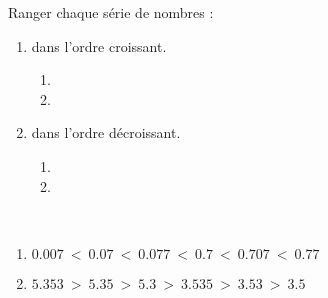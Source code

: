 \begin{exercice}
    Ranger chaque série de nombres :
    \begin{enumerate}
       \item dans l'ordre croissant. \smallskip
       \begin{enumerate}
          \item {} \;  \;  \;  \;  \;  \smallskip
          \item {} \;  \;  \;  \;  \; 
       \end{enumerate}
       \item dans l'ordre décroissant. \smallskip
       \begin{enumerate}
          \item {} \;  \;  \;  \;  \;  \smallskip
          \item {} \;  \;  \;  \;  \; 
       \end{enumerate}
    \end{enumerate}
\end{exercice}
 
\begin{corrige}
    \ \\ [-5mm]
    \begin{enumerate}
        \item {\red $\num{0.007} ~<~ \num{0.07} ~<~ \num{0.077} ~<~ \num{0.7   } ~<~ \num{0.707} ~<~ \num{0.77}$}
        \item {\red $\num{5.353} ~>~ \num{5.35} ~>~ \num{5.3}   ~>~ \num{3.535 } ~>~ \num{3.53}  ~>~ \num{3.5}$ }
    \end{enumerate}
\end{corrige}
